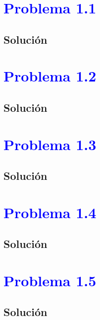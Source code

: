 \documentclass[12pt]{article}
\newcommand{\question}[1]{\textcolor{blue}{\textbf{#1}}}
\begin{document}



\section*{\question{Problema 1.1}}



\subsection*{Solución}


\section*{\textcolor{blue}{Problema 1.2}}


\subsection*{Solución}


\section*{\textcolor{blue}{Problema 1.3}}


\subsection*{Solución}

\section*{\textcolor{blue}{Problema 1.4}}


\subsection*{Solución}


\section*{\textcolor{blue}{Problema 1.5}}


\subsection*{Solución}
\end{document}
